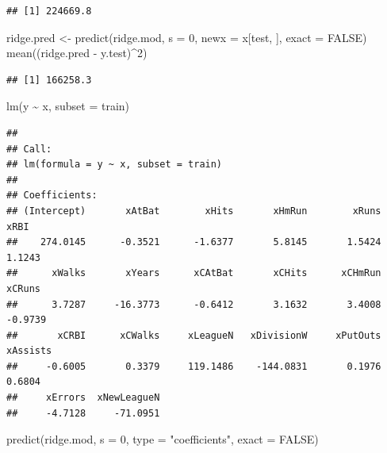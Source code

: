 \documentclass[
  12pt,
]{book}
\newenvironment{Shaded}{\begin{snugshade}}{\end{snugshade}}
\newcommand{\AttributeTok}[1]{\textcolor[rgb]{0.77,0.63,0.00}{#1}}
\newcommand{\ConstantTok}[1]{\textcolor[rgb]{0.00,0.00,0.00}{#1}}
\newcommand{\DecValTok}[1]{\textcolor[rgb]{0.00,0.00,0.81}{#1}}
\newcommand{\FunctionTok}[1]{\textcolor[rgb]{0.00,0.00,0.00}{#1}}
\newcommand{\NormalTok}[1]{#1}
\newcommand{\OtherTok}[1]{\textcolor[rgb]{0.56,0.35,0.01}{#1}}
\newcommand{\SpecialCharTok}[1]{\textcolor[rgb]{0.00,0.00,0.00}{#1}}
\newcommand{\StringTok}[1]{\textcolor[rgb]{0.31,0.60,0.02}{#1}}
\theoremstyle{definition}
\theoremstyle{definition}
\theoremstyle{definition}
\theoremstyle{remark}
\begin{document}
\begin{verbatim}
## [1] 224669.8
\end{verbatim}

\begin{Shaded}
\begin{Highlighting}[]
\NormalTok{ridge.pred }\OtherTok{\textless{}{-}} \FunctionTok{predict}\NormalTok{(ridge.mod, }\AttributeTok{s =} \DecValTok{0}\NormalTok{, }\AttributeTok{newx =}\NormalTok{ x[test, }
\NormalTok{    ], }\AttributeTok{exact =} \ConstantTok{FALSE}\NormalTok{)}
\FunctionTok{mean}\NormalTok{((ridge.pred }\SpecialCharTok{{-}}\NormalTok{ y.test)}\SpecialCharTok{\^{}}\DecValTok{2}\NormalTok{)}
\end{Highlighting}
\end{Shaded}

\begin{verbatim}
## [1] 166258.3
\end{verbatim}

\begin{Shaded}
\begin{Highlighting}[]
\FunctionTok{lm}\NormalTok{(y }\SpecialCharTok{\textasciitilde{}}\NormalTok{ x, }\AttributeTok{subset =}\NormalTok{ train)}
\end{Highlighting}
\end{Shaded}

\begin{verbatim}
## 
## Call:
## lm(formula = y ~ x, subset = train)
## 
## Coefficients:
## (Intercept)       xAtBat        xHits       xHmRun        xRuns         xRBI  
##    274.0145      -0.3521      -1.6377       5.8145       1.5424       1.1243  
##      xWalks       xYears      xCAtBat       xCHits      xCHmRun       xCRuns  
##      3.7287     -16.3773      -0.6412       3.1632       3.4008      -0.9739  
##       xCRBI      xCWalks     xLeagueN   xDivisionW     xPutOuts     xAssists  
##     -0.6005       0.3379     119.1486    -144.0831       0.1976       0.6804  
##     xErrors  xNewLeagueN  
##     -4.7128     -71.0951
\end{verbatim}

\begin{Shaded}
\begin{Highlighting}[]
\FunctionTok{predict}\NormalTok{(ridge.mod, }\AttributeTok{s =} \DecValTok{0}\NormalTok{, }\AttributeTok{type =} \StringTok{"coefficients"}\NormalTok{, }\AttributeTok{exact =} \ConstantTok{FALSE}\NormalTok{)}
\end{Highlighting}
\end{Shaded}
\end{document}
